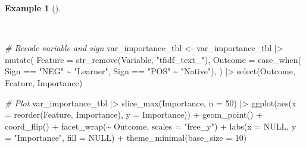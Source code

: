 \documentclass[
  letterpaper,
  krantz1]{latex/krantz-mod}
\newenvironment{Shaded}{\begin{snugshade}}{\end{snugshade}}
\newcommand{\AttributeTok}[1]{\textcolor[rgb]{0.00,0.00,0.00}{#1}}
\newcommand{\CommentTok}[1]{\textcolor[rgb]{0.00,0.00,0.00}{\textit{#1}}}
\newcommand{\ConstantTok}[1]{\textcolor[rgb]{0.00,0.00,0.00}{#1}}
\newcommand{\DecValTok}[1]{\textcolor[rgb]{0.00,0.00,0.00}{#1}}
\newcommand{\FunctionTok}[1]{\textcolor[rgb]{0.00,0.00,0.00}{#1}}
\newcommand{\NormalTok}[1]{\textcolor[rgb]{0.00,0.00,0.00}{#1}}
\newcommand{\OtherTok}[1]{\textcolor[rgb]{0.00,0.00,0.00}{#1}}
\newcommand{\SpecialCharTok}[1]{\textcolor[rgb]{0.00,0.00,0.00}{#1}}
\newcommand{\StringTok}[1]{\textcolor[rgb]{0.00,0.00,0.00}{#1}}
\theoremstyle{definition}
\theoremstyle{definition}
\newtheorem{example}{Example}[chapter]
\theoremstyle{remark}
\begin{document}
\begin{example}[]\protect\hypertarget{exm-predict-class-tune-hyperparameters-evaluate-test-vip-plot}{}\label{exm-predict-class-tune-hyperparameters-evaluate-test-vip-plot}

~

\begin{Shaded}
\begin{Highlighting}[numbers=left,,]
\CommentTok{\# Recode variable and sign}
\NormalTok{var\_importance\_tbl }\OtherTok{\textless{}{-}}
\NormalTok{  var\_importance\_tbl }\SpecialCharTok{|\textgreater{}}
  \FunctionTok{mutate}\NormalTok{(}
    \AttributeTok{Feature =} \FunctionTok{str\_remove}\NormalTok{(Variable, }\StringTok{"tfidf\_text\_"}\NormalTok{),}
    \AttributeTok{Outcome =} \FunctionTok{case\_when}\NormalTok{(}
\NormalTok{      Sign }\SpecialCharTok{==} \StringTok{"NEG"} \SpecialCharTok{\textasciitilde{}} \StringTok{"Learner"}\NormalTok{,}
\NormalTok{      Sign }\SpecialCharTok{==} \StringTok{"POS"} \SpecialCharTok{\textasciitilde{}} \StringTok{"Native"}\NormalTok{),}
\NormalTok{    ) }\SpecialCharTok{|\textgreater{}}
  \FunctionTok{select}\NormalTok{(Outcome, Feature, Importance)}

\CommentTok{\# Plot}
\NormalTok{var\_importance\_tbl }\SpecialCharTok{|\textgreater{}}
  \FunctionTok{slice\_max}\NormalTok{(Importance, }\AttributeTok{n =} \DecValTok{50}\NormalTok{) }\SpecialCharTok{|\textgreater{}}
  \FunctionTok{ggplot}\NormalTok{(}\FunctionTok{aes}\NormalTok{(}\AttributeTok{x =} \FunctionTok{reorder}\NormalTok{(Feature, Importance), }\AttributeTok{y =}\NormalTok{ Importance)) }\SpecialCharTok{+}
  \FunctionTok{geom\_point}\NormalTok{() }\SpecialCharTok{+}
  \FunctionTok{coord\_flip}\NormalTok{() }\SpecialCharTok{+}
  \FunctionTok{facet\_wrap}\NormalTok{(}\SpecialCharTok{\textasciitilde{}}\NormalTok{ Outcome, }\AttributeTok{scales =} \StringTok{"free\_y"}\NormalTok{) }\SpecialCharTok{+}
  \FunctionTok{labs}\NormalTok{(}\AttributeTok{x =} \ConstantTok{NULL}\NormalTok{, }\AttributeTok{y =} \StringTok{"Importance"}\NormalTok{, }\AttributeTok{fill =} \ConstantTok{NULL}\NormalTok{) }\SpecialCharTok{+}
  \FunctionTok{theme\_minimal}\NormalTok{(}\AttributeTok{base\_size =} \DecValTok{10}\NormalTok{)}
\end{Highlighting}
\end{Shaded}

\begin{figure}[!htb]

\end{figure}
\end{example}
\end{document}
